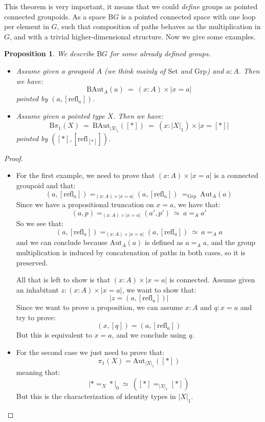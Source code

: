 \documentclass{article}
\newcommand{\refl}{\mathrm{refl}}
\newcommand{\Grp}{\mathrm{Grp}}
\newcommand{\B}{\mathrm{B}}
\newcommand{\Aut}{\mathrm{Aut}}
\newcommand{\Set}{\mathrm{Set}}
\newtheorem{proposition}{Proposition}
\begin{document}
This theorem is very important, it means that we could \emph{define} groups as pointed connected groupoids. As a space $\B G$ is a pointed connected space with one loop per element in $G$, such that composition of paths behaves as the multiplication in $G$, and with a trivial higher-dimensional structure. Now we give some examples.

\begin{proposition}
We describe $\B G$ for some already defined groups.
\begin{itemize}
\item Assume given a groupoid $A$ (we think mainly of $\Set$ and $\Grp$) and $a:A$. Then we have:
\[\B \Aut_A(a) \ = \ (x:A)\times |x=a|\]
pointed by $(a,[\refl_a])$.
\item Assume given a pointed type $X$. Then we have:
\[\B\pi_1(X) \ = \ \B\Aut_{|X|_1}([*])\ = \ (x:|X|_1)\times |x=[*]|\]
pointed by $([*],[\refl_{[*]}])$.
\end{itemize}
\end{proposition}
\begin{proof}
\begin{itemize}
\item For the first example, we need to prove that $(x:A)\times |x=a|$ is a connected groupoid and that: 
\[(a,[\refl_a]) =_{(x:A)\times |x=a|}(a,[\refl_a])\ =_\Grp\ \Aut_A(a)\]
Since we have a propositional truncation on $x=a$, we have that:
\[(a,p) =_{(x:A)\times |x=a|} (a',p') \ \simeq \ a=_Aa'\]
So we see that:
\[(a,[\refl_a]) =_{(x:A)\times |x=a|}(a,[\refl_a])\ \simeq\ a=_Aa\]
and we can conclude because $\Aut_A(a)$ is defined as $a=_Aa$, and the group multiplication is induced by concatenation of paths in both cases, so it is preserved.

All that is left to show is that $(x:A)\times |x=a|$ is connected. Assume given an inhabitant $z:(x:A)\times |x=a|$, we want to show that:
\[|z = (a,[\refl_a])|\]
Since we want to prove a proposition, we can assume $x:A$ and $q:x=a$ and try to prove:
\[(x,[q]) = (a,[\refl_a])\]
But this is equivalent to $x=a$, and we conclude using $q$.

\item For the second case we just need to prove that: 
\[\pi_1(X) = \Aut_{|X|_1}([*])\]
meaning that:
\[|*=_X*|_0 \ \simeq\ ([*] =_{|X|_1} [*])\] 
But this is the characterization of identity types in $|X|_1$. 
\end{itemize} 
\end{proof}
\end{document}

